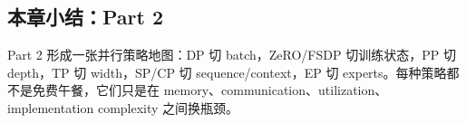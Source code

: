 \subsection{本章小结：Part 2}

Part 2 形成一张并行策略地图：DP 切 batch，ZeRO/FSDP 切训练状态，PP 切 depth，TP 切 width，SP/CP 切 sequence/context，EP 切 experts。每种策略都不是免费午餐，它们只是在 memory、communication、utilization、implementation complexity 之间换瓶颈。

